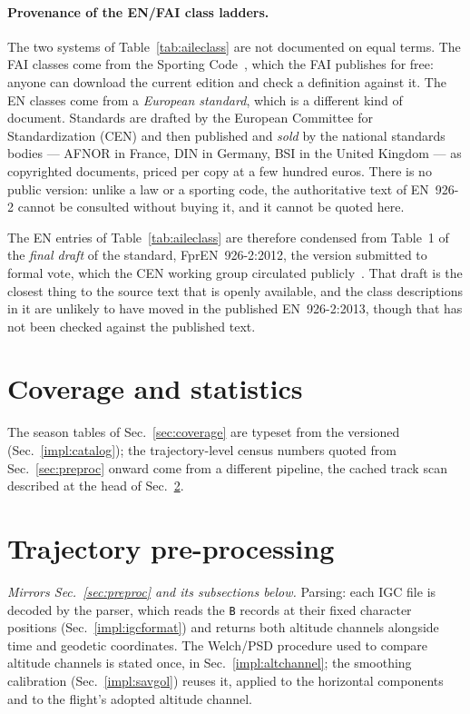 \begin{flowblock}
\paragraph{Provenance of the EN/FAI class ladders.} The two systems of
Table~\ref{tab:aileclass} are not documented on equal terms. The FAI classes come from the
Sporting Code~\cite{fai_sc7_2024}, which the FAI publishes for free: anyone can download the
current edition and check a definition against it. The EN classes come from a
\emph{European standard}, which is a different kind of document. Standards are drafted by
the European Committee for Standardization (CEN) and then published and \emph{sold} by the
national standards bodies --- AFNOR in France, DIN in Germany, BSI in the United Kingdom ---
as copyrighted documents, priced per copy at a few hundred euros. There is no public
version: unlike a law or a sporting code, the authoritative text of EN~926-2 cannot be
consulted without buying it, and it cannot be quoted here.

The EN entries of Table~\ref{tab:aileclass} are therefore condensed from Table~1 of the
\emph{final draft} of the standard, \mbox{FprEN~926-2:2012}, the version submitted to
formal vote, which the CEN working group circulated publicly~\cite{fpren926_2_2012}. That
draft is the closest thing to the source text that is openly available, and the class
descriptions in it are unlikely to have moved in the published \mbox{EN~926-2:2013}, though
that has not been checked against the published text.
\end{flowblock}

\section{Coverage and statistics}
\label{impl:coverage}
The season tables of Sec.~\ref{sec:coverage} are typeset from the versioned
 (Sec.~\ref{impl:catalog}); the trajectory-level census numbers
quoted from Sec.~\ref{sec:preproc} onward come from a different pipeline, the cached
track scan described at the head of Sec.~\ref{impl:preproc}.

\section{Trajectory pre-processing}
\label{impl:preproc}
\emph{Mirrors Sec.~\ref{sec:preproc} and its subsections below.} Parsing: each IGC
file is decoded by the  parser, which reads the \texttt{B}
records at their fixed character positions (Sec.~\ref{impl:igcformat}) and returns both
altitude channels alongside time and geodetic coordinates. The Welch/PSD
procedure used to compare altitude channels is stated once, in
Sec.~\ref{impl:altchannel}; the smoothing calibration (Sec.~\ref{impl:savgol}) reuses
it, applied to the horizontal components and to the flight's adopted altitude channel.

